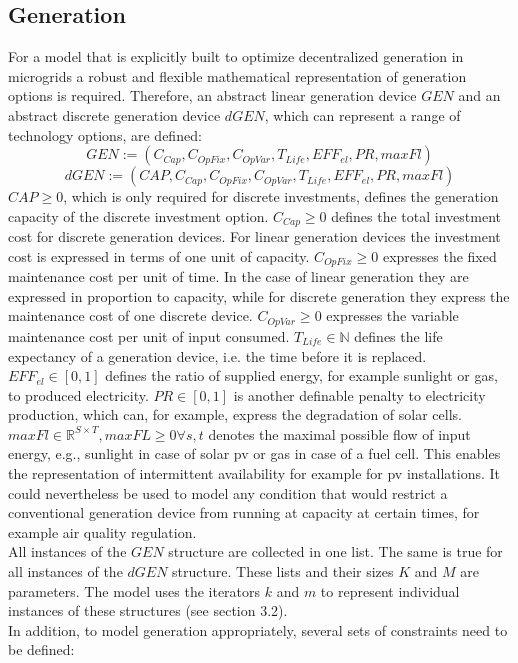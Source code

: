 \documentclass[
	11pt,								%
	DIV10,								%
	a4paper,         					%
	oneside,							%
	headheight=20pt,					%
	footheight=20pt,					%
    parskip=full,						%
    listof=totoc,						%
	bibliography=totoc,					%
	index=totoc,						%
]{scrartcl}
\begin{document}
\subsection{Generation}
For a model that is explicitly built to optimize decentralized generation in microgrids a robust and flexible mathematical representation of generation options is required.
Therefore, an abstract linear generation device $GEN$ and an abstract discrete generation device $dGEN$, which can represent a range of technology options, are defined:\\
	\begin{equation}
		GEN := (C_{Cap}, C_{OpFix}, C_{OpVar}, T_{Life}, EFF_{el}, PR, maxFl)
	\end{equation}
	\begin{equation}
		dGEN := (CAP, C_{Cap}, C_{OpFix}, C_{OpVar}, T_{Life}, EFF_{el}, PR, maxFl)
	\end{equation}
	$CAP \geq 0$, which is only required for discrete investments, defines the generation capacity of the discrete investment option.
	$C_{Cap} \geq 0$ defines the total investment cost for discrete generation devices. For linear generation devices the investment cost is expressed in terms of one unit of capacity.
	$C_{OpFix} \geq 0$ expresses the fixed maintenance cost per unit of time. In the case of linear generation they are expressed in proportion to capacity, while for discrete generation they express the maintenance cost of one discrete device.
	$C_{OpVar} \geq 0$ expresses the variable maintenance cost per unit of input consumed.
	$T_{Life} \in \mathbb{N}$ defines the life expectancy of a generation device, i.e. the time before it is replaced. 
	$EFF_{el} \in [0,1]$ defines the ratio of supplied energy, for example sunlight or gas, to produced electricity.
	$PR \in [0,1]$ is another definable penalty to electricity production, which can, for example, express the degradation of solar cells. 	
	$maxFl \in \mathbb{R}^{S \times T}, maxFL \geq 0 \forall s,t$ denotes the maximal possible flow of input energy, e.g., sunlight in case of solar pv or gas in case of a fuel cell. This enables the representation of intermittent availability for example for pv installations. It could nevertheless be used to model any condition that would restrict a conventional generation device from running at capacity at certain times, for example air quality regulation.  \\
	All instances of the $GEN$ structure are collected in one list. The same is true for all instances of the $dGEN$ structure. These lists and their sizes $K$ and $M$ are parameters. The model uses the iterators $k$ and $m$ to represent individual instances of these structures (see section 3.2).
	\\
	In addition, to model generation appropriately, several sets of constraints need to be defined:
	
\end{document}
